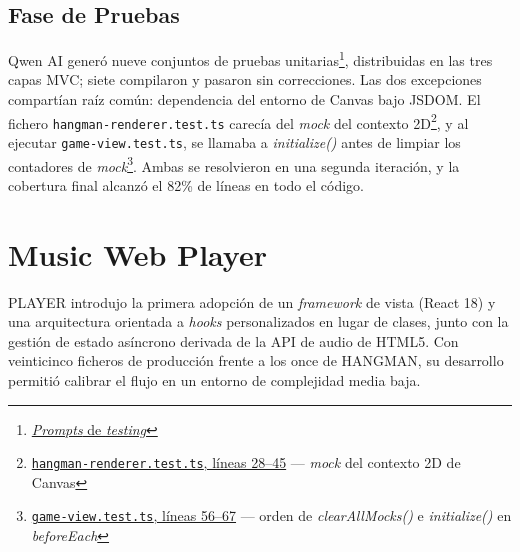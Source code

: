 \subsection{Fase de Pruebas}

Qwen AI generó nueve conjuntos de pruebas unitarias\footnote{\href{https://github.com/alu0101549491/TFG-Fabian-Gonzalez-Lence/tree/main/resources/prompts/1-TheHangmanGame/5-TestingPorModulo}{\textit{Prompts} de \textit{testing}}}, distribuidas en las tres capas \ac{MVC}; siete compilaron y pasaron sin correcciones. Las dos excepciones compartían raíz común: dependencia del entorno de Canvas bajo JSDOM. El fichero \texttt{hangman-renderer.test.ts} carecía del \textit{mock} del contexto 2D\footnote{\href{https://github.com/alu0101549491/TFG-Fabian-Gonzalez-Lence/blob/main/projects/1-TheHangmanGame/tests/views/hangman-renderer.test.ts\#L28-L45}{\texttt{hangman-renderer.test.ts}, líneas 28--45} — \textit{mock} del contexto 2D de Canvas}, y al ejecutar \texttt{game-view.test.ts}, se llamaba a \textit{initialize()} antes de limpiar los contadores de \textit{mock}\footnote{\href{https://github.com/alu0101549491/TFG-Fabian-Gonzalez-Lence/blob/main/projects/1-TheHangmanGame/tests/views/game-view.test.ts\#L56-L67}{\texttt{game-view.test.ts}, líneas 56--67} — orden de \textit{clearAllMocks()} e \textit{initialize()} en \textit{beforeEach}}. Ambas se resolvieron en una segunda iteración, y la cobertura final alcanzó el 82\% de líneas en todo el código.

\section{Music Web Player} \label{sec:dev-player}

\ac{PLAYER} introdujo la primera adopción de un \textit{framework} de vista (React 18) y una arquitectura orientada a \textit{hooks} personalizados en lugar de clases, junto con la gestión de estado asíncrono derivada de la \ac{API} de audio de HTML5. Con veinticinco ficheros de producción frente a los once de \ac{HANGMAN}, su desarrollo permitió calibrar el flujo en un entorno de complejidad media baja.


